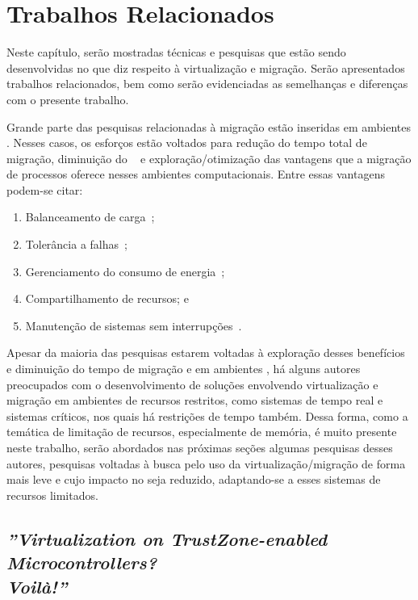 \glsresetall
\chapter{Trabalhos Relacionados}
\label{chap.related-work}

Neste capítulo, serão mostradas técnicas e pesquisas que estão sendo desenvolvidas no que diz respeito à virtualização e migração. Serão apresentados trabalhos relacionados, bem como serão evidenciadas as semelhanças e diferenças com o presente trabalho.

Grande parte das pesquisas relacionadas à migração estão inseridas em ambientes \cloud. Nesses casos, os esforços estão voltados para redução do tempo total de migração, diminuição do \downtime~\cite{migration-linux-conteiners,clark2005live} e exploração/otimização das vantagens que a migração de processos oferece nesses ambientes computacionais. Entre essas vantagens podem-se citar:
\begin{enumerate}[label=(\roman*)]
    \item Balanceamento de carga~\cite{live-vm-migration-techniques,ada-things};
    \item Tolerância a falhas~\cite{fernando2019live};
    \item Gerenciamento do consumo de energia~\cite{aldossary2018performance};
    \item Compartilhamento de recursos; e
    \item Manutenção de sistemas sem interrupções~\cite{live-vm-migration-techniques,ada-things}.
\end{enumerate}

Apesar da maioria das pesquisas estarem voltadas à exploração desses benefícios e diminuição do tempo de migração e \downtime em ambientes \cloud, há alguns autores preocupados com o desenvolvimento de soluções envolvendo virtualização e migração em ambientes de recursos restritos, como sistemas de tempo real e sistemas críticos, nos quais há restrições de tempo também. Dessa forma, como a temática de limitação de recursos, especialmente de memória, é muito presente neste trabalho, serão abordados nas próximas seções algumas pesquisas desses autores, \ie pesquisas voltadas à busca pelo uso da virtualização/migração de forma mais leve e cujo impacto no \hardware seja reduzido, adaptando-se a esses sistemas de recursos limitados.

\section{\textit{''Virtualization on TrustZone-enabled Microcontrollers?\\ Voilà!''}}

